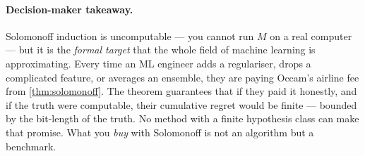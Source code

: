 \paragraph{Decision-maker takeaway.}  Solomonoff induction is
uncomputable --- you cannot run $M$ on a real computer --- but it is
the \emph{formal target} that the whole field of machine learning is
approximating.  Every time an ML engineer adds a regulariser, drops
a complicated feature, or averages an ensemble, they are paying
Occam's airline fee from \cref{thm:solomonoff}.  The theorem
guarantees that if they paid it honestly, and if the truth were
computable, their cumulative regret would be finite --- bounded by
the bit-length of the truth.  No method with a finite hypothesis
class can make that promise.  What you \emph{buy} with Solomonoff is
not an algorithm but a benchmark.

